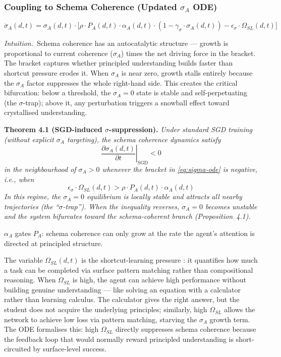 \documentclass[10pt]{article}
\begin{document}
\subsubsection{Coupling to Schema Coherence (Updated \texorpdfstring{$\sigma_A$}{sigma\_A} ODE)}
\begin{equation}\label{eq:sigma-ode}
\dot{\sigma}_A(d,t) = \sigma_A(d,t) \cdot \bigl[ \rho \cdot P_A(d,t) \cdot \alpha_A(d,t) \cdot (1 - \gamma_{\sigma} \cdot \sigma_A(d,t)) - \epsilon_{\sigma} \cdot \Omega_{SL}(d,t) \bigr]
\end{equation}

\noindent\textit{Intuition.}\ Schema coherence has an autocatalytic
structure --- growth is proportional to current coherence ($\sigma_A$)
times the net driving force in the bracket. The bracket captures whether
principled understanding builds faster than shortcut pressure erodes it.
When $\sigma_A$ is near zero, growth stalls entirely because the
$\sigma_A$ factor suppresses the whole right-hand side. This creates the
critical bifurcation: below a threshold, the $\sigma_A = 0$ state is
stable and self-perpetuating (the $\sigma$-trap); above it, any
perturbation triggers a snowball effect toward crystallised
understanding.

\textbf{Theorem 4.1 (SGD-induced $\sigma$-suppression).} %
\textit{Under standard SGD training (without explicit $\sigma_A$ targeting), the schema coherence dynamics satisfy}
\[
\left.\frac{\partial \sigma_A(d,t)}{\partial t}\right|_{\text{SGD}} < 0
\]
\textit{in the neighbourhood of $\sigma_A > 0$ whenever the bracket in \eqref{eq:sigma-ode} is negative, i.e., when}
\[
\epsilon_{\sigma} \cdot \Omega_{SL}(d,t) > \rho \cdot P_A(d,t) \cdot \alpha_A(d,t)
\]
\textit{In this regime, the $\sigma_A = 0$ equilibrium is locally stable and attracts all nearby trajectories (the ``$\sigma$-trap''). When the inequality reverses, $\sigma_A = 0$ becomes unstable and the system bifurcates toward the schema-coherent branch (Proposition~4.1).}

$\alpha_A$ gates $P_A$: schema coherence can only grow at the rate the
agent's attention is directed at principled structure.

The variable $\Omega_{SL}(d,t)$ is the shortcut-learning pressure \citep{geirhos2020shortcutlearning}: it quantifies how much a task can be completed via surface pattern matching rather than compositional reasoning. When $\Omega_{SL}$ is high, the agent can achieve high performance without building genuine understanding --- like solving an equation with a calculator rather than learning calculus. The calculator gives the right answer, but the student does not acquire the underlying principles; similarly, high $\Omega_{SL}$ allows the network to achieve low loss via pattern matching, starving the $\sigma_A$ growth term. The ODE formalises this: high $\Omega_{SL}$ directly suppresses schema coherence because the feedback loop that would normally reward principled understanding is short-circuited by surface-level success.
\end{document}
